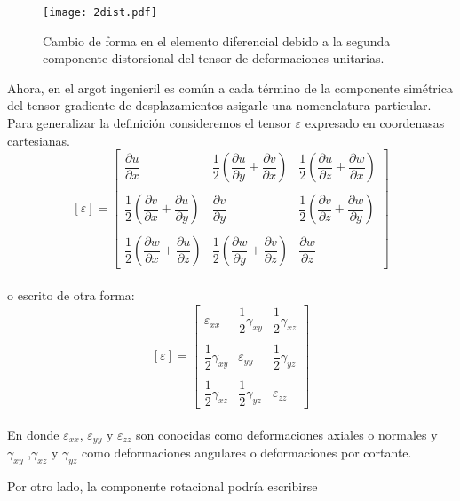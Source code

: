 \documentclass[../notas medios.tex]{subfiles}
\begin{document}
\begin{figure}[H]
\centering
	\texttt{[image: 2dist.pdf]}
	\caption{Cambio de forma en el elemento diferencial debido a la segunda componente distorsional del tensor de deformaciones unitarias.}
	\label{2dist}
\end{figure}

Ahora, en el argot ingenieril es común a cada término de la componente simétrica del tensor gradiente de desplazamientos asigarle una nomenclatura particular. Para generalizar la definición consideremos el tensor $\varepsilon$ expresado en coordenasas cartesianas. 
\[	
[\varepsilon] =
\begin{bmatrix}
	\dfrac{\partial u}{\partial x} & \dfrac{1}{2} \left(\dfrac{\partial u}{\partial y} + \dfrac{\partial v}{\partial x}\right)  & \dfrac{1}{2} \left(\dfrac{\partial u}{\partial z} + \dfrac{\partial w}{\partial x}\right) \\\\
	\dfrac{1}{2} \left( \dfrac{\partial v}{\partial x} + \dfrac{\partial u}{\partial y} \right)  & \dfrac{\partial v}{\partial y} & \dfrac{1}{2} \left(\dfrac{\partial v}{\partial z}+\dfrac{\partial w}{\partial y}\right) \\\\
	 \dfrac{1}{2} \left(\dfrac{\partial w}{\partial x} + \dfrac{\partial u}{\partial z} \right) & \dfrac{1}{2} \left(\dfrac{\partial w}{\partial y} + \dfrac{\partial v}{\partial z}\right)  & \dfrac{\partial w}{\partial z}
\end{bmatrix}\]\\

o escrito de otra forma: 
\[	
[\varepsilon] =
\begin{bmatrix}
	\varepsilon_{xx} & \dfrac{1}{2} \gamma_{xy} & \dfrac{1}{2} \gamma_{xz}  \\\\
	\dfrac{1}{2} \gamma_{xy}  & \varepsilon_{yy} & \dfrac{1}{2}  \gamma_{yz}  \\\\
	 \dfrac{1}{2} \gamma_{xz} & \dfrac{1}{2} \gamma_{yz}  &  \varepsilon_{zz}
\end{bmatrix}\]\\

En donde $\varepsilon_{xx}$, $\varepsilon_{yy}$ y $\varepsilon_{zz}$ son conocidas como deformaciones axiales o normales y  $\gamma_{xy}$ ,$ \gamma_{xz}$  y $\gamma_{yz}$  como deformaciones angulares o deformaciones por cortante. 

Por otro lado, la componente rotacional podría escribirse 
\end{document}
